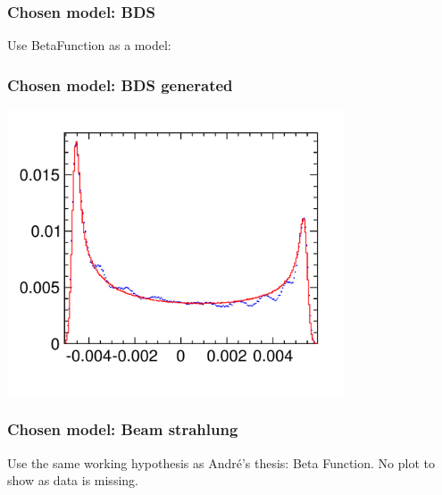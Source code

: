 \documentclass[handout]{beamer}
\begin{document}
\begin{frame}
\frametitle{Chosen model: BDS}
Use BetaFunction as a model:\\
\end{frame}
\begin{frame}
\frametitle{Chosen model: BDS generated}
\includegraphics[width=10cm]{MCBeamSpread}
\end{frame}
\begin{frame}
\frametitle{Chosen model: Beam strahlung}
Use the same working hypothesis as Andr\'e's thesis: Beta Function. No plot to
show as data is missing.
\end{frame}
\end{document}
